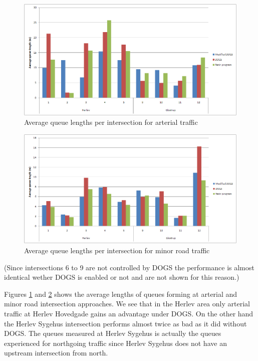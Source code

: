 \begin{figure}[ht]
\begin{center}
\includegraphics[scale=0.30]{aveq_intersection_arterial.png} 
\end{center}
\caption{Average queue lengths per intersection for arterial traffic}
\label{fig:aveq_int_art}
\end{figure}

\begin{figure}[ht]
\begin{center}
\includegraphics[scale=0.30]{aveq_intersection_crossing.png} 
\end{center}
\caption{Average queue lengths per intersection for minor road traffic}
\label{fig:aveq_int_cross}
\end{figure}

(Since intersections 6 to 9 are not controlled by DOGS the performance is almost identical wether DOGS is enabled or not and are not shown for this reason.)

Figures \ref{fig:aveq_int_art} and \ref{fig:aveq_int_cross} shows the average lengths of queues forming at arterial and  minor road intersection approaches. We see that in the Herlev area only arterial traffic at Herlev Hovedgade gains an advantage under DOGS. On the other hand the Herlev Sygehus intersection performs almost twice as bad as it did without DOGS. The queues measured at Herlev Sygehus is actually the queues experienced for northgoing traffic since Herlev Sygehus does not have an upstream intersection from north.

